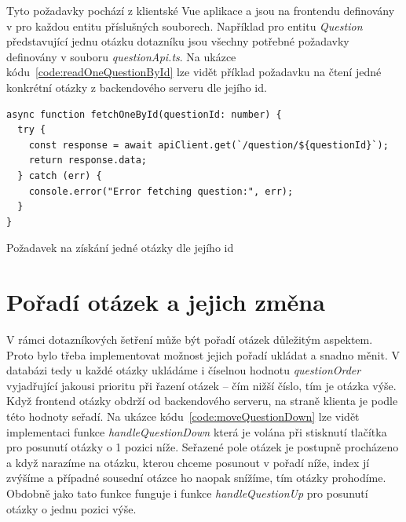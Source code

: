 Tyto požadavky pochází z klientské Vue aplikace a jsou na frontendu definovány v pro každou entitu příslušných souborech. Například pro entitu \textit{Question}
představující jednu otázku dotazníku jsou všechny potřebné požadavky definovány v souboru \textit{questionApi.ts}. Na ukázce kódu~\ref{code:readOneQuestionById} lze vidět příklad
požadavku na čtení jedné konkrétní otázky z backendového serveru dle jejího id.

\begin{listing}[h!]
    \begin{verbatim}
async function fetchOneById(questionId: number) {
  try {
    const response = await apiClient.get(`/question/${questionId}`);
    return response.data;
  } catch (err) {
    console.error("Error fetching question:", err);
  }
}
    \end{verbatim}
\caption{Požadavek na získání jedné otázky dle jejího id}
\label{code:readOneQuestionById}
\end{listing}


\section{Pořadí otázek a jejich změna}
V rámci dotazníkových šetření může být pořadí otázek důležitým aspektem. Proto bylo třeba implementovat možnost
jejich pořadí ukládat a snadno měnit. V databázi tedy u každé otázky ukládáme i číselnou hodnotu \textit{questionOrder} vyjadřující jakousi
prioritu při řazení otázek – čím nižší číslo, tím je otázka výše. Když frontend otázky obdrží od backendového serveru,
na straně klienta je podle této hodnoty seřadí. Na ukázce kódu~\ref{code:moveQuestionDown} lze vidět implementaci funkce \textit{handleQuestionDown} která je volána
při stisknutí tlačítka pro posunutí otázky o 1 pozici níže. Seřazené pole otázek je postupně procházeno a když narazíme na otázku, kterou
chceme posunout v pořadí níže, index jí zvýšíme a případné sousední otázce ho naopak snížíme, tím otázky prohodíme. Obdobně jako tato funkce
funguje i funkce \textit{handleQuestionUp} pro posunutí otázky o jednu pozici výše.

